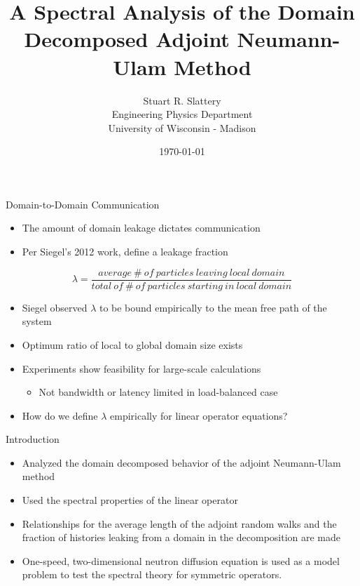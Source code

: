 \documentclass{beamer}
\author{Stuart R. Slattery
  \\ Engineering Physics Department
  \\ University of Wisconsin - Madison
}
\date{\today}
\title{A Spectral Analysis of the Domain Decomposed Adjoint
  Neumann-Ulam Method}
\begin{document}
\maketitle

\begin{frame}{Domain-to-Domain Communication}

  \begin{itemize}
  \item The amount of domain leakage dictates communication
    \medskip
  \item Per Siegel's 2012 work, define a leakage fraction
  \end{itemize}

  \[
  \lambda =
  \frac{average\ \#\ of\ particles\ leaving\ local\ domain}{total\ of\ \#\ of\ particles\ starting\ in\ local\ domain}
  \]

  \medskip
  \begin{itemize}
  \item Siegel observed $\lambda$ to be bound empirically to the mean
    free path of the system
    \medskip
  \item Optimum ratio of local to global domain size exists
    \medskip
  \item Experiments show feasibility for large-scale calculations
    \begin{itemize}
    \item Not bandwidth or latency limited in load-balanced case
    \end{itemize}
    \pause
    \medskip
  \item How do we define $\lambda$ empirically for linear operator
    equations?
  \end{itemize}

\end{frame}

\begin{frame}{Introduction}

  \begin{itemize}
  \item Analyzed the domain decomposed behavior of the adjoint
    Neumann-Ulam method
  \item Used the spectral properties of the linear operator
  \item Relationships for the average length of the adjoint random
    walks and the fraction of histories leaking from a domain in the
    decomposition are made
  \item One-speed, two-dimensional neutron diffusion equation is used
    as a model problem to test the spectral theory for symmetric
    operators.
  \end{itemize}

\end{frame}
\end{document}
